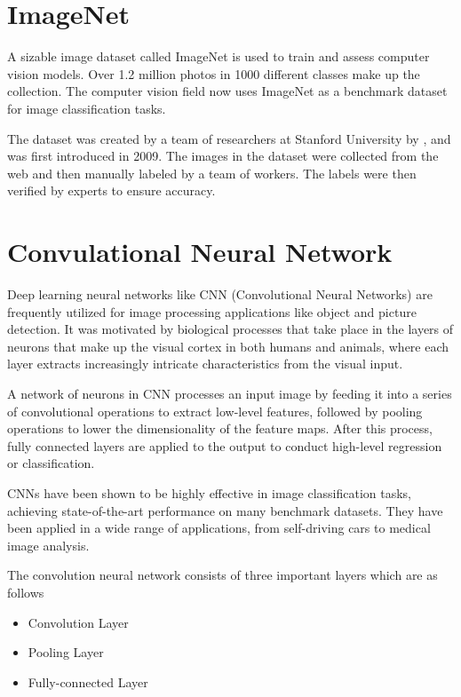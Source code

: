 \section{ImageNet}

A sizable image dataset called ImageNet is used to train and assess computer vision models. Over 1.2 million photos in 1000 different classes make up the collection. The computer vision field now uses ImageNet as a benchmark dataset for image classification tasks.

\bigskip

The dataset was created by a team of researchers at Stanford University by \cite{Deng:2009}, and was first introduced in 2009. The images in the dataset were collected from the web and then manually labeled by a team of workers. The labels were then verified by experts to ensure accuracy. 

\section{Convulational Neural Network}

Deep learning neural networks like CNN (Convolutional Neural Networks) are frequently utilized for image processing applications like object and picture detection. It was motivated by biological processes that take place in the layers of neurons that make up the visual cortex in both humans and animals, where each layer extracts increasingly intricate characteristics from the visual input.

\bigskip

A network of neurons in CNN processes an input image by feeding it into a series of convolutional operations to extract low-level features, followed by pooling operations to lower the dimensionality of the feature maps. After this process, fully connected layers are applied to the output to conduct high-level regression or classification.

\bigskip

CNNs have been shown to be highly effective in image classification tasks, achieving state-of-the-art performance on many benchmark datasets. They have been applied in a wide range of applications, from self-driving cars to medical image analysis.\cite{KE:2022}


The convolution neural network consists of three important layers which are as follows
\begin{itemize}
	\item	Convolution Layer
	\item	Pooling Layer
	\item	Fully-connected Layer
\end{itemize}

